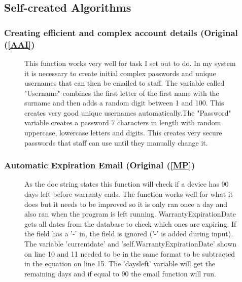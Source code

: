 \begin{landscape}
\subsection{Self-created Algorithms}

\subsubsection{Creating efficient and complex account details (Original (\ref{AAI})}

\begin{figure}[H]
    \caption{This function works very well for task I set out to do. In my system it is necessary to create initial complex passwords and unique usernames that can then be emailed to staff. \newline The variable called "Username" combines the first letter of the first name with the surname and then adds a random digit between 1 and 100. This creates very good unique usernames automatically.\newline The "Password" variable creates a password 7 characters in length with random uppercase, lowercase letters and digits. This creates very secure passwords that staff can use until they manually change it.}  
\end{figure}


\subsubsection{Automatic Expiration Email (Original (\ref{MP})}

\begin{figure}[H]
\end{figure}

\begin{figure}[H]
    \caption{As the doc string states this function will check if a device has 90 days left before warranty ends. The function works well for what it does but it needs to be improved so it is only ran once a day and also ran when the program is left running. \newline WarrantyExpirationDate gets all dates from the database to check which ones are expiring. If the field has a '-' in, the field is ignored ('-' is added during input). \newline The variable 'currentdate' and 'self.WarrantyExpirationDate' shown on line 10 and 11 needed to be in the same format to be subtracted in the equation on line 15. The 'daysleft' variable will get the remaining days and if equal to 90 the email function will run. } 
\end{figure}


\end{landscape}
